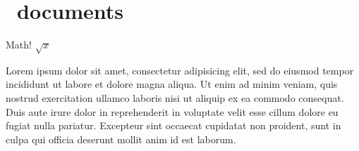 \chapter{\PolyTeX\ documents} %
\label{cha:polytex_documents}

Math! $\sqrt{x}$

Lorem ipsum dolor sit amet, consectetur adipisicing elit, sed do eiusmod
tempor incididunt ut labore et dolore magna aliqua. Ut enim ad minim veniam,
quis nostrud exercitation ullamco laboris nisi ut aliquip ex ea commodo
consequat. Duis aute irure dolor in reprehenderit in voluptate velit esse
cillum dolore eu fugiat nulla pariatur. Excepteur sint occaecat cupidatat non
proident, sunt in culpa qui officia deserunt mollit anim id est laborum.


